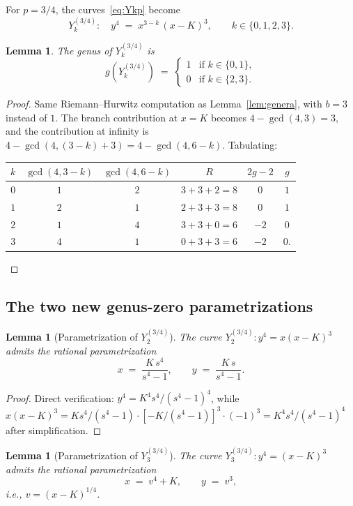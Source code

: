 \documentclass[11pt,a4paper]{article}
\theoremstyle{plain}
\newtheorem{lemma}[theorem]{Lemma}
\theoremstyle{definition}
\theoremstyle{remark}
\begin{document}
For $p = 3/4$, the curves~\eqref{eq:Ykp} become
\[
  Y_k^{(3/4)}\colon \quad y^4 \;=\; x^{3-k}\,(x - K)^3, \qquad k \in \{0, 1, 2, 3\}.
\]

\begin{lemma}\label{lem:genera-34}
The genus of $Y_k^{(3/4)}$ is
\[
  g(Y_k^{(3/4)}) \;=\; \begin{cases} 1 & \text{if } k \in \{0, 1\}, \\ 0 & \text{if } k \in \{2, 3\}. \end{cases}
\]
\end{lemma}

\begin{proof}
Same Riemann--Hurwitz computation as Lemma~\ref{lem:genera}, with $b = 3$ instead of $1$. The branch contribution at $x = K$ becomes $4 - \gcd(4, 3) = 3$, and the contribution at infinity is $4 - \gcd(4, (3-k)+3) = 4 - \gcd(4, 6-k)$. Tabulating:
\begin{center}
\begin{tabular}{c|ccc|cc}
$k$ & $\gcd(4, 3-k)$ & $\gcd(4, 6-k)$ & $R$ & $2g-2$ & $g$ \\
\hline
$0$ & $1$ & $2$ & $3 + 3 + 2 = 8$ & $0$ & $1$ \\
$1$ & $2$ & $1$ & $2 + 3 + 3 = 8$ & $0$ & $1$ \\
$2$ & $1$ & $4$ & $3 + 3 + 0 = 6$ & $-2$ & $0$ \\
$3$ & $4$ & $1$ & $0 + 3 + 3 = 6$ & $-2$ & $0$. \qedhere
\end{tabular}
\end{center}
\end{proof}

\subsection*{The two new genus-zero parametrizations}

\begin{lemma}[Parametrization of $Y_2^{(3/4)}$]\label{lem:Y2-34-param}
The curve $Y_2^{(3/4)}\colon y^4 = x(x-K)^3$ admits the rational parametrization
\[
  x \;=\; \frac{K\,s^4}{s^4 - 1}, \qquad y \;=\; \frac{K\,s}{s^4 - 1}.
\]
\end{lemma}

\begin{proof}
Direct verification: $y^4 = K^4 s^4/(s^4-1)^4$, while $x(x-K)^3 = K s^4/(s^4-1) \cdot [-K/(s^4-1)]^3 \cdot (-1)^3 = K^4 s^4/(s^4-1)^4$ after simplification.
\end{proof}

\begin{lemma}[Parametrization of $Y_3^{(3/4)}$]\label{lem:Y3-34-param}
The curve $Y_3^{(3/4)}\colon y^4 = (x-K)^3$ admits the rational parametrization
\[
  x \;=\; v^4 + K, \qquad y \;=\; v^3,
\]
i.e., $v = (x-K)^{1/4}$.
\end{lemma}
\end{document}
